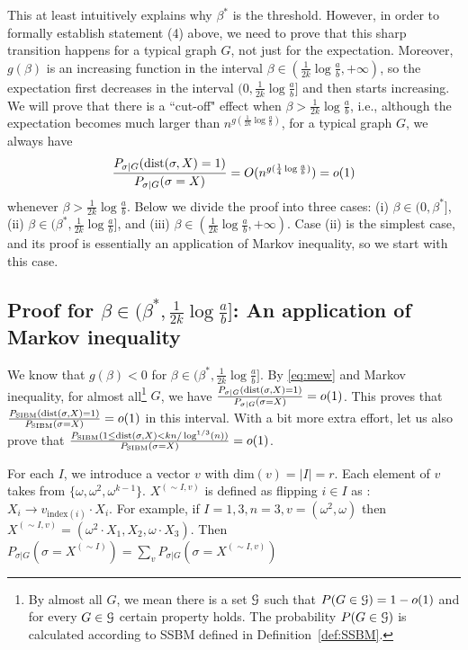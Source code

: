 \documentclass{article}
\begin{document}
This at least intuitively explains why $\beta^\ast$ is the threshold. However, in order to formally establish statement (4) above, we need to prove that this sharp transition happens for a typical graph $G$, not just for the expectation.
Moreover, $g(\beta)$ is an increasing function in the interval $\beta\in(\frac{1}{2k}\log\frac{a}{b}, +\infty)$, so the expectation first decreases in the interval $(0,\frac{1}{2k}\log\frac{a}{b}]$ and then starts increasing. We will prove that there is a ``cut-off" effect when $\beta>\frac{1}{2k}\log\frac{a}{b}$, i.e., although the expectation becomes much larger than $n^{g(\frac{1}{2k}\log\frac{a}{b})}$, for a typical graph $G$, we always have
$$
\frac{P_{\sigma|G} ( \operatorname{dist}(\sigma, X) = 1 )}{P_{\sigma|G}(\sigma= X)} 
= O( n^{g(\frac{1}{4}\log\frac{a}{b})} ) =o(1)
$$
whenever $\beta>\frac{1}{2k}\log\frac{a}{b}$.
Below we divide the proof into three cases: (i) $\beta\in(0,\beta^\ast]$, (ii) $\beta\in(\beta^\ast,\frac{1}{2k}\log\frac{a}{b}]$, and (iii) $\beta\in(\frac{1}{2k}\log\frac{a}{b},+\infty)$.
Case (ii) is the simplest case, and its proof is essentially an application of Markov inequality, so we start with this case.

\subsection{Proof for $\beta\in(\beta^\ast,\frac{1}{2k}\log\frac{a}{b}]$: An application of Markov inequality}
\label{sect:simreg}

We know that $g(\beta)<0$ for $\beta\in(\beta^\ast,\frac{1}{2k}\log\frac{a}{b}]$. By \eqref{eq:mew} and Markov inequality, for almost all\footnote{By almost all $G$, we mean there is a set $\mathcal{G}$ such that $P(G\in\mathcal{G})=1-o(1)$ and for every $G\in\mathcal{G}$ certain property holds. The probability $P(G\in\mathcal{G})$ is calculated according to SSBM defined in Definition~\ref{def:SSBM}.} $G$, we have $\frac{P_{\sigma|G} ( \operatorname{dist}(\sigma, X) = 1 )}{P_{\sigma|G}(\sigma= X)}=o(1)$. This proves that $\frac{P_{\operatorname{SIBM}} ( \operatorname{dist}(\sigma, X) = 1 )}{P_{\operatorname{SIBM}}(\sigma= X)}=o(1)$ in this interval. With a bit more extra effort, let us also prove that $\frac{P_{\operatorname{SIBM}} ( 1\le \operatorname{dist}(\sigma, X)< kn/\log^{1/3}(n) )}{P_{\operatorname{SIBM}}(\sigma= X)}=o(1)$.

For each $I$, we introduce a vector $v$ with $\mathrm{dim}(v) = |I|=r$. Each element of $v$ takes from $\{\omega, \omega^2, \omega^{k-1}\}$.
$X^{(\sim I, v)}$ is defined as flipping $i \in I$ as : $X_i \to v_{\mathrm{index}(i)}\cdot X_i$.
For example, if $I = {1,3}, n=3, v=(\omega^2, \omega)$ then $X^{(\sim I,v)} = (\omega^2 \cdot X_1, X_2, \omega \cdot X_3)$.
Then $P_{\sigma|G}(\sigma = X^{(\sim I)})=\sum_{v}P_{\sigma|G}(\sigma = X^{(\sim I,v)})$
\end{document}

